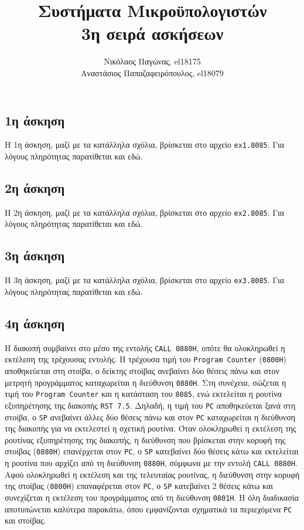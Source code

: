 \documentclass[a4paper]{article}
\title{Συστήματα Μικροϋπολογιστών \\ 3η σειρά ασκήσεων}
\author{Νικόλαος Παγώνας, el18175 \\ Αναστάσιος Παπαζαφειρόπουλος, el18079}
\date{}
\begin{document}
\maketitle

\subsection*{1η άσκηση}
Η 1η άσκηση, μαζί με τα κατάλληλα σχόλια, βρίσκεται στο αρχείο \texttt{ex1.8085}.
Για λόγους πληρότητας παρατίθεται και εδώ.


\subsection*{2η άσκηση}
Η 2η άσκηση, μαζί με τα κατάλληλα σχόλια, βρίσκεται στο αρχείο \texttt{ex2.8085}.
Για λόγους πληρότητας παρατίθεται και εδώ.

\subsection*{3η άσκηση}
Η 3η άσκηση, μαζί με τα κατάλληλα σχόλια, βρίσκεται στο αρχείο \texttt{ex3.8085}.
Για λόγους πληρότητας παρατίθεται και εδώ.


\subsection*{4η άσκηση}

Η διακοπή συμβαίνει στο μέσο της εντολής \texttt{CALL 0880H}, οπότε θα ολοκληρωθεί η εκτέλεση της τρέχουσας εντολής. Η τρέχουσα τιμή του \texttt{Program Counter} (\texttt{0800Η}) αποθηκεύεται στη στοίβα, ο δείκτης στοίβας ανεβαίνει δύο θέσεις πάνω και στον μετρητή προγράμματος καταχωρείται η διεύθυνση \texttt{0880Η}. Στη συνέχεια, σώζεται η τιμή του \texttt{Program Counter} και η κατάσταση του \texttt{8085}, ενώ εκτελείται η ρουτίνα εξυπηρέτησης της διακοπής \texttt{RST 7.5}. Δηλαδή, η τιμή του \texttt{PC} αποθηκεύεται ξανά στη στοίβα, ο \texttt{SP} ανεβαίνει άλλες δύο θέσεις πάνω και στον \texttt{PC} καταχωρείται η διεύθυνση της διακοπής για να εκτελεστεί η σχετική ρουτίνα.  Όταν ολοκληρωθεί η εκτέλεση της ρουτίνας εξυπηρέτησης της διακοπής, η διεύθυνση που βρίσκεται στην κορυφή της στοίβας (\texttt{0880Η}) επανέρχεται στον \texttt{PC}, ο \texttt{SP} κατεβαίνει δύο θέσεις κάτω και εκτελείται η ρουτίνα που αρχίζει από τη διεύθυνση \texttt{0880Η}, σύμφωνα με την εντολή \texttt{CALL 0880H}. Αφού ολοκληρωθεί η εκτέλεση και της τελευταίας ρουτίνας, η διεύθυνση στην κορυφή της στοίβας (\texttt{0800Η}) επαναφέρεται στον \texttt{PC}, ο \texttt{SP} κατεβαίνει 2 θέσεις κάτω και συνεχίζεται η εκτέλεση του προγράμματος από τη διεύθυνση \texttt{0801Η}. Η όλη διαδικασία αποτυπώνεται καλύτερα παρακάτω, όπου εμφανίζονται σχηματικά τα περιεχόμενα \texttt{PC} και στοίβας.
\end{document}
